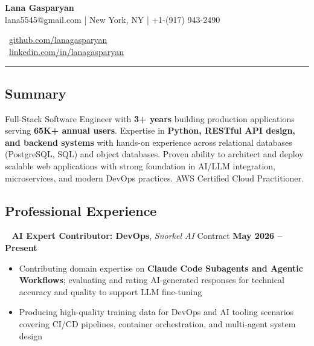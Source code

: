 \documentclass[12pt,letterpaper]{article}
\newcommand{\normalsizesection}{\normalsize}
\newcommand{\smallersection}{\small}
\newcommand{\sectionbox}[1]{%
    \vspace{0.1em}
    \begin{tcolorbox}[
        colback=sectionbg,
        colframe=sectionbg,
        width=\textwidth,
        left=5pt,
        right=5pt,
        top=2pt,
        bottom=2pt,
        boxrule=0pt,
        arc=0pt,
        boxsep=0pt,
    ]
    \section*{#1}
    \end{tcolorbox}
    \vspace{-0.4em}
}
\newcommand{\yearsright}[1]{{\footnotesize\bfseries\color{yearcolor} #1}}
\newenvironment{projectentry}{%
    \leftskip=0cm
    \par\noindent
}{\par\leftskip=0cm\vspace{-2pt}}
\newenvironment{projectdesc}{%
    \footnotesize
    \begin{itemize}[leftmargin=*, topsep=0pt, itemsep=0pt, parsep=0pt]
}{\end{itemize}\smallersection\vspace{1pt}}
\newcommand{\iconlink}[3]{%
    #1~\href{#2}{#3}%
}
\newcommand{\projicon}[1]{%
    {\small\color{gray!70}#1}~%
}
\begin{document}
\begin{minipage}[t]{0.6\textwidth}
    \vspace{0pt}
    \fontsize{24pt}{28pt}\selectfont\textbf{\color{namecolor}Lana Gasparyan}\\[8pt]
    \footnotesize lana5545@gmail.com | New York, NY | +1-(917) 943-2490
\end{minipage}%
\begin{minipage}[t]{0.4\textwidth}
    \vspace{0pt}
    \raggedright
    \footnotesize\iconlink{\faGithub}{https://github.com/lanagasparyan}{github.com/lanagasparyan}\\
    \footnotesize\iconlink{\faLinkedin}{https://www.linkedin.com/in/lanagasparyan}{linkedin.com/in/lanagasparyan}
\end{minipage}

\vspace{-1mm}
\noindent\rule{\textwidth}{0.4pt}
\vspace{-4mm}

\sectionbox{Summary}
\smallersection

\noindent Full-Stack Software Engineer with \textbf{3+ years} building production applications serving \textbf{65K+ annual users}. Expertise in \textbf{Python, RESTful API design, and backend systems} with hands-on experience across relational databases (PostgreSQL, SQL) and object databases. Proven ability to architect and deploy scalable web applications with strong foundation in AI/LLM integration, microservices, and modern DevOps practices. AWS Certified Cloud Practitioner.

\normalsizesection

\sectionbox{Professional Experience}
\smallersection

\begin{projectentry}
    \projicon{\faBriefcase} \textbf{AI Expert Contributor: DevOps}, \textit{Snorkel AI} \textemdash{} Contract \hfill \yearsright{May 2026 -- Present}
\end{projectentry}
\begin{projectdesc}
    \item Contributing domain expertise on \textbf{Claude Code Subagents and Agentic Workflows}; evaluating and rating AI-generated responses for technical accuracy and quality to support LLM fine-tuning
    \item Producing high-quality training data for DevOps and AI tooling scenarios covering CI/CD pipelines, container orchestration, and multi-agent system design
\end{projectdesc}
\end{document}
